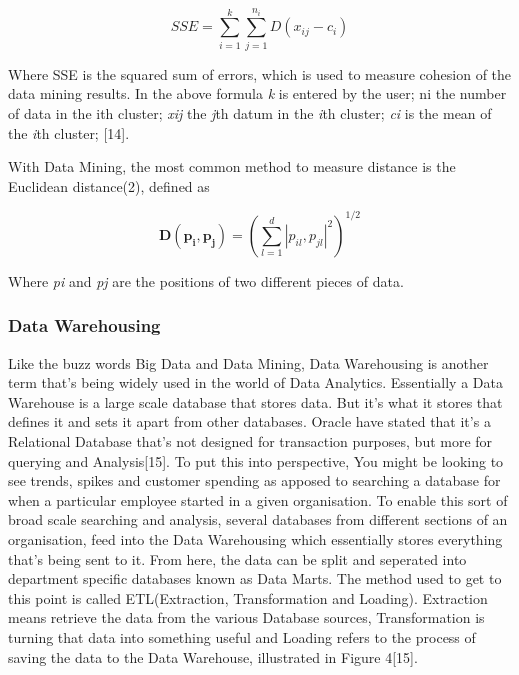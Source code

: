 \documentclass[10pt,journal,compsoc]{IEEEtran}
\begin{document}
\begin{equation}
	SSE = \sum_{i=1}^{k} \sum_{j=1}^{n_i} D( x_{ij} - c_i)
\end{equation}

Where SSE is the squared sum of errors, which is used to measure cohesion of the data mining results. In the above formula \textit{k} is entered by the user; ni the number of
data in the ith cluster; \textit{xij} the \textit{j}th datum in the \textit{i}th cluster; \textit{ci} is the mean of the \textit{i}th cluster; [14]. 

With Data Mining, the most common method to measure distance is the Euclidean distance(2), defined as

\begin{equation}
\mathbf{D(p_{i}, p_{j})} = 
\left(
\sum_{l=1}^{d} |p_{il}, p_{jl}|^2
\right)^{1/2}
\end{equation}

Where \textit{pi} and \textit{pj} are the positions of two different pieces of data.

\subsubsection{Data Warehousing}
Like the buzz words Big Data and Data Mining, Data Warehousing is another term that's being widely used in the world of Data Analytics. Essentially a Data Warehouse is a large scale database that stores data. But it's what it stores that defines it and sets it apart from other databases. Oracle have stated that it's a Relational Database that's not designed for transaction purposes, but more for querying and Analysis[15]. To put this into perspective, You might be looking to see trends, spikes and customer spending as apposed to searching a database for when a particular employee started in a given organisation. To enable this sort of broad scale searching and analysis, several databases from different sections of an organisation, feed into the Data Warehousing which essentially stores everything that's being sent to it. From here, the data can be split and seperated into department specific databases known as Data Marts. The method used to get to this point is called ETL(Extraction, Transformation and Loading). Extraction means retrieve the data from the various Database sources, Transformation is turning that data into something useful and Loading refers to the process of saving the data to the Data Warehouse, illustrated in Figure 4[15].\\
\end{document}

